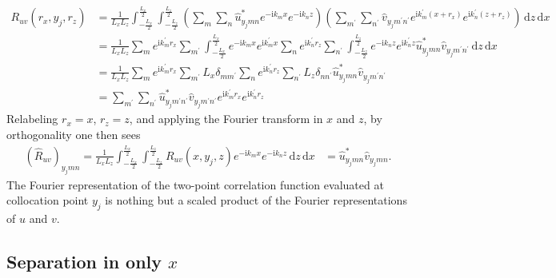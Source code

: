 \documentclass[letterpaper,11pt,nointlimits,reqno]{amsart}
\newcommand{\ii}{\ensuremath{\mathrm{i}}}
\begin{document}
\begin{align}
R_{uv} \left( r_x, y_j, r_z \right)
  &= \frac{1}{L_x L_z}
     \int_{-\frac{L_x}{2}}^{\frac{L_x}{2}}
     \int_{-\frac{L_z}{2}}^{\frac{L_z}{2}}
        \left(
         \sum_{m}\sum_{n}
         \hat{u}^\ast_{y_j m n}
         e^{-\ii k_m x}e^{-\ii k_n z}
       \right)
       \left(
         \sum_{m^\prime}\sum_{n^\prime}
         \hat{v}_{y_j m^\prime n^\prime}
         e^{\ii k_m^\prime \left(x+r_x\right)}e^{\ii k_n^\prime \left(z+r_z\right)}
       \right)
     \,\mathrm{d}z
     \,\mathrm{d}x
\\
  &= \frac{1}{L_x L_z}
     \sum_{m}
     e^{\ii k_m^\prime r_x}
     \sum_{m^\prime}
     \int_{-\frac{L_x}{2}}^{\frac{L_x}{2}}
     e^{-\ii k_m x} e^{\ii k_m^\prime x}
     \sum_{n}
     e^{\ii k_n^\prime r_z}
     \sum_{n^\prime}
     \int_{-\frac{L_z}{2}}^{\frac{L_z}{2}}
     e^{-\ii k_n z} e^{\ii k_n^\prime z}
     \hat{u}^\ast_{y_j m n}
     \hat{v}_{y_j m^\prime n^\prime}
     \,\mathrm{d}z
     \,\mathrm{d}x
\\
  &= \frac{1}{L_x L_z}
     \sum_{m}
     e^{\ii k_m^\prime r_x}
     \sum_{m^\prime}
     L_x \delta_{m m^\prime}
     \sum_{n}
     e^{\ii k_n^\prime r_z}
     \sum_{n^\prime}
     L_z \delta_{n n^\prime}
     \hat{u}^\ast_{y_j m n}
     \hat{v}_{y_j m^\prime n^\prime}
\\
  &= \sum_{m^\prime}
     \sum_{n^\prime}
     \hat{u}^\ast_{y_j m^\prime n^\prime}
     \hat{v}_{y_j m^\prime n^\prime}
     e^{\ii k_m^\prime r_x}
     e^{\ii k_n^\prime r_z}
    \label{eq:twopointxz_physical}
\end{align}
Relabeling $r_x = x$, $r_z = z$, and applying the Fourier transform in $x$ and
$z$, by orthogonality one then sees
\begin{align}
\left(\hat{R}_{uv}\right)_{y_j m n}
    =
    \frac{1}{L_x L_z}
    \int_{-\frac{L_x}{2}}^{\frac{L_x}{2}}
    \int_{-\frac{L_z}{2}}^{\frac{L_z}{2}}
    R_{uv} \left( x, y_j, z \right)
    e^{-\ii k_m x}
    e^{-\ii k_n z}
    \,\mathrm{d}z
    \,\mathrm{d}x
    &=
    \hat{u}^\ast_{y_j m n}
    \hat{v}_{y_j m n}.
    \label{eq:twopointxz_wave}
\end{align}
The Fourier representation of the two-point correlation function evaluated at
collocation point $y_j$ is nothing but a scaled product of the Fourier
representations of $u$ and $v$.

\subsection{Separation in only $x$}
\end{document}
